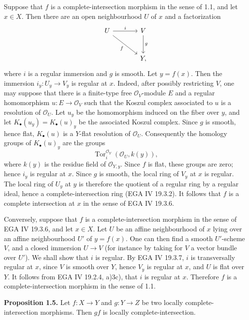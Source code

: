 \documentclass[11pt]{article}
\newcommand{\Tor}{\operatorname{Tor}}
\providecommand{\Tor}{\operatorname{Tor}}
\begin{document}
Suppose that $f$ is a complete-intersection morphism in the sense of 1.1, and let $x\in X$. Then there are an open neighbourhood $U$ of $x$ and a factorization
\[
\begin{tikzcd}[column sep=large,row sep=large]
U \arrow[r,"i"] \arrow[dr,"f"'] & V \arrow[d,"g"]\\
& Y,
\end{tikzcd}
\]
where $i$ is a regular immersion and $g$ is smooth. Let $y=f(x)$. Then the immersion $i_y:U_y\to V_y$ is regular at $x$. Indeed, after possibly restricting $V$, one may suppose that there is a finite-type free $\mathcal O_V$-module $E$ and a regular homomorphism $u:E\to\mathcal O_V$ such that the Koszul complex associated to $u$ is a resolution of $\mathcal O_U$. Let $u_y$ be the homomorphism induced on the fiber over $y$, and let $K_\bullet(u_y)=K_\bullet(u)_y$ be the associated Koszul complex. Since $g$ is smooth, hence flat, $K_\bullet(u)$ is a $Y$-flat resolution of $\mathcal O_U$. Consequently the homology groups of $K_\bullet(u)_y$ are the groups
\[
\Tor_i^{\mathcal O_Y}(\mathcal O_U,k(y)),
\]
where $k(y)$ is the residue field of $\mathcal O_{Y,y}$. Since $f$ is flat, these groups are zero; hence $i_y$ is regular at $x$. Since $g$ is smooth, the local ring of $V_y$ at $x$ is regular. The local ring of $U_y$ at $y$ is therefore the quotient of a regular ring by a regular ideal, hence a complete-intersection ring (EGA IV 19.3.2). It follows that $f$ is a complete intersection at $x$ in the sense of EGA IV 19.3.6.

Conversely, suppose that $f$ is a complete-intersection morphism in the sense of EGA IV 19.3.6, and let $x\in X$. Let $U$ be an affine neighbourhood of $x$ lying over an affine neighbourhood $U'$ of $y=f(x)$. One can then find a smooth $U'$-scheme $V$, and a closed immersion $U\to V$ (for instance by taking for $V$ a vector bundle over $U'$). We shall show that $i$ is regular. By EGA IV 19.3.7, $i$ is transversally regular at $x$, since $V$ is smooth over $Y$, hence $V_y$ is regular at $x$, and $U$ is flat over $Y$. It follows from EGA IV 19.2.4, a)3c), that $i$ is regular at $x$. Therefore $f$ is a complete-intersection morphism in the sense of 1.1.

\textbf{Proposition 1.5.} Let $f:X\to Y$ and $g:Y\to Z$ be two locally complete-intersection morphisms. Then $gf$ is locally complete-intersection.
\end{document}
